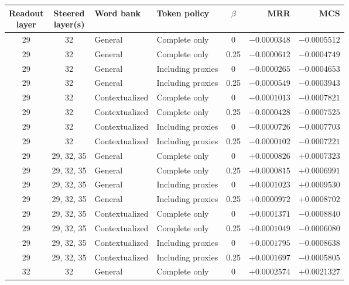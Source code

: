 \begin{table}[p]
\centering
\scriptsize
\setlength{\tabcolsep}{4pt}
\renewcommand{\arraystretch}{0.88}
\begin{tabular*}{\textwidth}{@{\extracolsep{\fill}}ccllcrr@{}}
\toprule
\shortstack{Readout\\layer} & \shortstack{Steered\\layer(s)} & Word bank & Token policy & $\beta$ & MRR & MCS \\
\midrule
29 & 32 & General & Complete only & 0 & $-0.0000348$ & $-0.0005512$ \\
29 & 32 & General & Complete only & 0.25 & $-0.0000612$ & $-0.0004749$ \\
29 & 32 & General & Including proxies & 0 & $-0.0000265$ & $-0.0004653$ \\
29 & 32 & General & Including proxies & 0.25 & $-0.0000549$ & $-0.0003943$ \\
29 & 32 & Contextualized & Complete only & 0 & $-0.0001013$ & $-0.0007821$ \\
29 & 32 & Contextualized & Complete only & 0.25 & $-0.0000428$ & $-0.0007525$ \\
29 & 32 & Contextualized & Including proxies & 0 & $-0.0000726$ & $-0.0007703$ \\
29 & 32 & Contextualized & Including proxies & 0.25 & $-0.0000102$ & $-0.0007221$ \\
29 & 29, 32, 35 & General & Complete only & 0 & $+0.0000826$ & $+0.0007323$ \\
29 & 29, 32, 35 & General & Complete only & 0.25 & $+0.0000815$ & $+0.0006991$ \\
29 & 29, 32, 35 & General & Including proxies & 0 & $+0.0001023$ & $+0.0009530$ \\
29 & 29, 32, 35 & General & Including proxies & 0.25 & $+0.0000972$ & $+0.0008702$ \\
29 & 29, 32, 35 & Contextualized & Complete only & 0 & $+0.0001371$ & $-0.0008840$ \\
29 & 29, 32, 35 & Contextualized & Complete only & 0.25 & $+0.0001049$ & $-0.0006080$ \\
29 & 29, 32, 35 & Contextualized & Including proxies & 0 & $+0.0001795$ & $-0.0008638$ \\
29 & 29, 32, 35 & Contextualized & Including proxies & 0.25 & $+0.0001697$ & $-0.0005805$ \\
\midrule
32 & 32 & General & Complete only & 0 & $+0.0002574$ & $+0.0021327$ \\

\end{tabular*}
\end{table}
